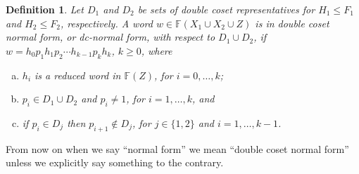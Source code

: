 \documentclass[a4paper,12pt]{article}
\newtheorem{definition}[theorem]{Definition}
\numberwithin{equation}{section}
\numberwithin{figure}{section}
\newcommand{\FF}{\ensuremath{\mathbb{F}}}
\newcommand{\be}{\begin{enumerate}}
\newcommand{\ee}{\end{enumerate}}
\begin{document}
\begin{definition}\label{def:dcnf}
 Let $D_1$ and $D_2$ be sets of  double coset representatives for
$H_1\le F_1$ and $H_2\le F_2$, respectively.
A word $w\in \FF(X_1\cup X_2\cup Z)$ is in
\emph{double coset normal form}, or \emph{dc-normal form}, with
respect to $D_1\cup D_2$, if
$w = h_{0}p_1h_{1}p_2 \cdots h_{k-1}p_kh_{{k}}$, $k\ge 0$,   where 
\be[(a)]
\item $h_i$ is a reduced word in $\FF(Z)$, for $i=0,\ldots, k$;
\item  $p_i  \in D_1\cup D_2$ and $p_i\neq 1$, for $i=1,\ldots, k$,  and
\item if  $p_i\in D_j$ then $p_{i+1}\notin D_j$, for $j\in \{1,2\}$
and $i=1,\ldots ,k-1$.
\ee
\end{definition}
From now on when we say ``normal form'' we mean ``double coset normal form'' unless
we explicitly say something to the contrary.
\end{document}
